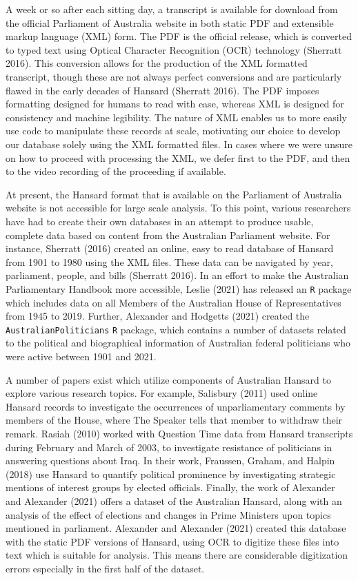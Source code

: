 \documentclass[
  letterpaper,
  DIV=11,
  numbers=noendperiod]{scrartcl}
\begin{document}
A week or so after each sitting day, a transcript is available for
download from the official Parliament of Australia website in both
static PDF and extensible markup language (XML) form. The PDF is the
official release, which is converted to typed text using Optical
Character Recognition (OCR) technology (Sherratt 2016). This conversion
allows for the production of the XML formatted transcript, though these
are not always perfect conversions and are particularly flawed in the
early decades of Hansard (Sherratt 2016). The PDF imposes formatting
designed for humans to read with ease, whereas XML is designed for
consistency and machine legibility. The nature of XML enables us to more
easily use code to manipulate these records at scale, motivating our
choice to develop our database solely using the XML formatted files. In
cases where we were unsure on how to proceed with processing the XML, we
defer first to the PDF, and then to the video recording of the
proceeding if available.

At present, the Hansard format that is available on the Parliament of
Australia website is not accessible for large scale analysis. To this
point, various researchers have had to create their own databases in an
attempt to produce usable, complete data based on content from the
Australian Parliament website. For instance, Sherratt (2016) created an
online, easy to read database of Hansard from 1901 to 1980 using the XML
files. These data can be navigated by year, parliament, people, and
bills (Sherratt 2016). In an effort to make the Australian Parliamentary
Handbook more accessible, Leslie (2021) has released an \texttt{R}
package which includes data on all Members of the Australian House of
Representatives from 1945 to 2019. Further, Alexander and Hodgetts
(2021) created the \texttt{AustralianPoliticians} \texttt{R} package,
which contains a number of datasets related to the political and
biographical information of Australian federal politicians who were
active between 1901 and 2021.

A number of papers exist which utilize components of Australian Hansard
to explore various research topics. For example, Salisbury (2011) used
online Hansard records to investigate the occurrences of unparliamentary
comments by members of the House, where The Speaker tells that member to
withdraw their remark. Rasiah (2010) worked with Question Time data from
Hansard transcripts during February and March of 2003, to investigate
resistance of politicians in answering questions about Iraq. In their
work, Fraussen, Graham, and Halpin (2018) use Hansard to quantify
political prominence by investigating strategic mentions of interest
groups by elected officials. Finally, the work of Alexander and
Alexander (2021) offers a dataset of the Australian Hansard, along with
an analysis of the effect of elections and changes in Prime Ministers
upon topics mentioned in parliament. Alexander and Alexander (2021)
created this database with the static PDF versions of Hansard, using OCR
to digitize these files into text which is suitable for analysis. This
means there are considerable digitization errors especially in the first
half of the dataset.
\end{document}
